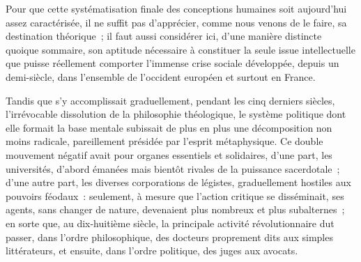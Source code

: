 \documentclass[french,twoside]{book} %
\begin{document}
Pour que cette systématisation finale des conceptions humaines soit aujourd’hui assez caractérisée, il ne suffit pas d’apprécier, comme nous venons de le faire, sa destination théorique ; il faut aussi considérer ici, d’une manière distincte quoique sommaire, son aptitude nécessaire à constituer la seule issue intellectuelle que puisse réellement comporter l’immense crise sociale développée, depuis un demi-siècle, dans l’ensemble de l’occident européen et surtout en France.\par
Tandis que s’y accomplissait graduellement, pendant les cinq derniers siècles, l’irrévocable dissolution de la philosophie théologique, le système politique dont elle formait la base mentale subissait de plus en plus une décomposition non moins radicale, pareillement présidée par l’esprit métaphysique. Ce double mouvement négatif avait pour organes essentiels et solidaires, d’une part, les universités, d’abord émanées mais bientôt rivales de la puissance sacerdotale ; d’une autre part, les diverses corporations de légistes, graduellement hostiles aux pouvoirs féodaux : seulement, à mesure que l’action critique se disséminait, ses agents, sans changer de nature, devenaient plus nombreux et plus subalternes ; en sorte que, au dix-huitième siècle, la principale activité révolutionnaire dut passer, dans l’ordre philosophique, des docteurs proprement dits aux simples littérateurs, et ensuite, dans l’ordre politique, des juges aux avocats.\par
\end{document}
